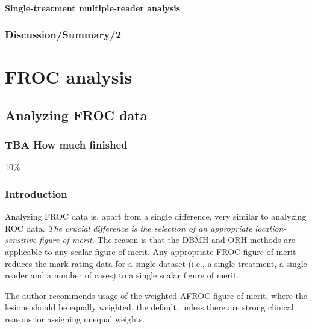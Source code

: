 \documentclass[
]{book}
\begin{document}
\hypertarget{roc-sample-size-dbm-STMRAnalysis}{%
\subsection{Single-treatment multiple-reader analysis}\label{roc-sample-size-dbm-STMRAnalysis}}

\hypertarget{discussionsummary2}{%
\section{Discussion/Summary/2}\label{discussionsummary2}}

\hypertarget{part-froc-analysis}{%
\part*{FROC analysis}\label{part-froc-analysis}}

\hypertarget{analyzing-froc-data}{%
\chapter{Analyzing FROC data}\label{analyzing-froc-data}}

\hypertarget{analyzing-froc-data-how-much-finished}{%
\section{TBA How much finished}\label{analyzing-froc-data-how-much-finished}}

10\%

\hypertarget{analyzing-froc-data-intro}{%
\section{Introduction}\label{analyzing-froc-data-intro}}

Analyzing FROC data is, apart from a single difference, very similar to analyzing ROC data. \emph{The crucial difference is the selection of an appropriate location-sensitive figure of merit.} The reason is that the DBMH and ORH methods are applicable to any scalar figure of merit. Any appropriate FROC figure of merit reduces the mark rating data for a single dataset (i.e., a single treatment, a single reader and a number of cases) to a single scalar figure of merit.

The author recommends usage of the weighted AFROC figure of merit, where the lesions should be equally weighted, the default, unless there are strong clinical reasons for assigning unequal weights.
\end{document}
